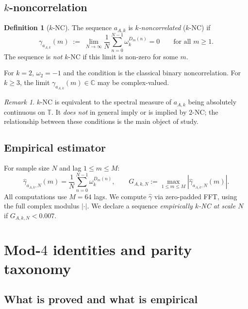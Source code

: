 \documentclass[11pt]{article}
\theoremstyle{definition}
\newtheorem{definition}[theorem]{Definition}
\theoremstyle{remark}
\newtheorem{remark}[theorem]{Remark}
\newcommand{\T}{\mathbb{T}}
\newcommand{\C}{\mathbb{C}}
\begin{document}
\subsection{$k$-noncorrelation}

\begin{definition}[$k$-NC]
The sequence $a_{A,k}$ is \emph{$k$-noncorrelated} ($k$-NC) if
\[
  \gamma_{a_{A,k}}(m)
  \;:=\; \lim_{N \to \infty} \frac{1}{N} \sum_{n=0}^{N-1}
         \omega_k^{D_m(n)} = 0
  \qquad \text{for all } m \geq 1.
\]
The sequence is \emph{not} $k$-NC if this limit is non-zero for some $m$.
\end{definition}

For $k = 2$, $\omega_2 = -1$ and the condition is the classical binary
noncorrelation.  For $k \geq 3$, the limit $\gamma_{a_{A,k}}(m) \in \C$
may be complex-valued.

\begin{remark}
$k$-NC is equivalent to the spectral measure of $a_{A,k}$ being
absolutely continuous on $\T$.  It \emph{does not} in general imply
or is implied by $2$-NC; the relationship between these conditions is
the main object of study.
\end{remark}

\subsection{Empirical estimator}

For sample size $N$ and lag $1 \leq m \leq M$:
\[
  \hat\gamma_{a_{A,k},N}(m)
  = \frac{1}{N}\sum_{n=0}^{N-1} \omega_k^{D_m(n)},
  \qquad
  G_{A,k,N} := \max_{1 \leq m \leq M} |\hat\gamma_{a_{A,k},N}(m)|.
\]
All computations use $M = 64$ lags.  We compute $\hat\gamma$ via
zero-padded FFT, using the full complex modulus $|\cdot|$.  We declare
a sequence \emph{empirically $k$-NC at scale $N$} if $G_{A,k,N} < 0.007$.

\section{Mod-$4$ identities and parity taxonomy}
\label{sec:parity}

\subsection{What is proved and what is empirical}
\end{document}
